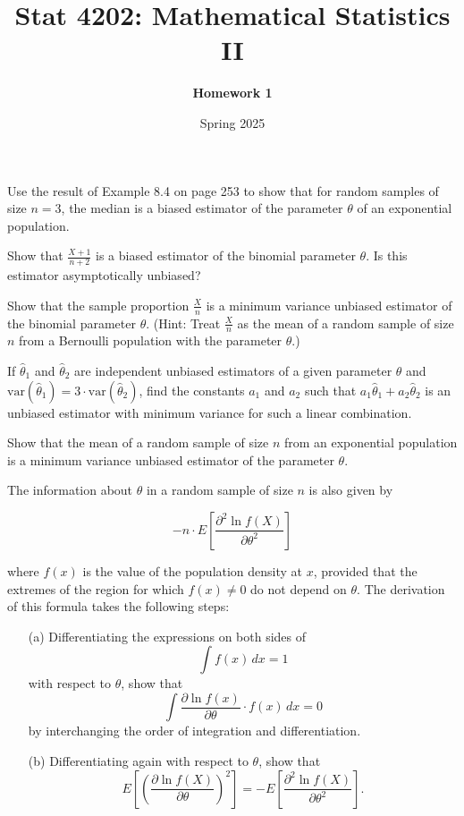 \documentclass[11pt]{article}
\title{Stat 4202: Mathematical Statistics II}
\author{\textbf{Homework 1}}
\date{Spring 2025}
\begin{document}
\maketitle
\begin{question}
    Use the result of Example 8.4 on page 253 to show that for random samples of size \(n = 3\), the median is a biased estimator of the parameter \(\theta\) of an exponential population.
\end{question}

\begin{question}
    Show that \(\frac{X + 1}{n + 2}\) is a biased estimator of the binomial parameter \(\theta\). Is this estimator asymptotically unbiased?
\end{question}
\begin{question}
    Show that the sample proportion \(\frac{X}{n}\) is a minimum variance unbiased estimator of the binomial parameter \(\theta\). (Hint: Treat \(\frac{X}{n}\) as the mean of a random sample of size \(n\) from a Bernoulli population with the parameter \(\theta\).)
\end{question}
\begin{question}
    If \(\hat{\theta}_1\) and \(\hat{\theta}_2\) are independent unbiased estimators of a given parameter \(\theta\) and \(\text{var}(\hat{\theta}_1) = 3 \cdot \text{var}(\hat{\theta}_2)\), find the constants \(a_1\) and \(a_2\) such that \(a_1 \hat{\theta}_1 + a_2 \hat{\theta}_2\) is an unbiased estimator with minimum variance for such a linear combination.
\end{question}
\begin{question}
    Show that the mean of a random sample of size \(n\) from an exponential population is a minimum variance unbiased estimator of the parameter \(\theta\).
\end{question}
\begin{question}The information about $\theta$ in a random sample of size $n$ is also given by

    \[
        -n \cdot E \left[ \frac{\partial^2 \ln f(X)}{\partial \theta^2} \right]
    \]

    where $f(x)$ is the value of the population density at $x$, provided that the
    extremes of the region for which $f(x) \neq 0$ do not depend on $\theta$. The
    derivation of this formula takes the following steps:

    \begin{enumerate}
        \item[(a)] Differentiating the expressions on both sides of
            \[
                \int f(x) \, dx = 1
            \]
            with respect to $\theta$, show that
            \[
                \int \frac{\partial \ln f(x)}{\partial \theta} \cdot f(x) \, dx = 0
            \]
            by interchanging the order of integration and differentiation.

        \item[(b)] Differentiating again with respect to $\theta$, show that
            \[
                E \left[ \left( \frac{\partial \ln f(X)}{\partial \theta} \right)^2 \right] = -E \left[ \frac{\partial^2 \ln f(X)}{\partial \theta^2} \right].
            \]
    \end{enumerate}
\end{question}
\end{document}
